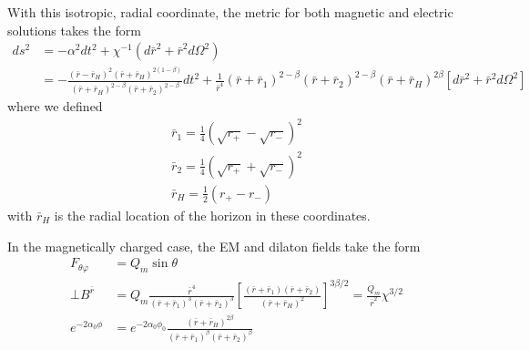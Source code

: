 \documentclass[prd]{revtex4}
\begin{document}
With this isotropic, radial coordinate, the metric for both magnetic and electric solutions takes the form
\begin{align}
ds^2 &= - \alpha^2 dt^2 + \chi^{-1} (d\bar{r}^2 + \bar{r}^2 d\Omega^2) \nonumber \\
        &= -\frac{(\bar{r} - \bar{r}_H)^2 (\bar{r}+\bar{r}_H)^{2(1-\beta)}}{(\bar{r}+\bar{r}_H)^{2-\beta} (\bar{r}+\bar{r}_2)^{2-\beta}} dt^2 + \frac{1}{\bar{r}^4}(\bar{r}+\bar{r}_1)^{2-\beta} (\bar{r}+\bar{r}_2)^{2-\beta} (\bar{r} + \bar{r}_H)^{2\beta} [ d\bar{r}^2 + \bar{r}^2 d\Omega^2]
\end{align}
where we defined
\begin{align}
\bar{r}_1 = \frac{1}{4} (\sqrt{r_+} - \sqrt{r_-})^2 \\
\bar{r}_2 = \frac{1}{4} (\sqrt{r_+} + \sqrt{r_-})^2 \\
\bar{r}_H = \frac{1}{2} (r_+ - r_-)
\end{align}
with $\bar{r}_H$ is the radial location of the horizon in these coordinates.

In the magnetically charged case, the EM and dilaton fields take the form
\begin{align}
F_{\theta \varphi} &= Q_m \sin \theta \\
\bot B^{\bar{r}} &= Q_m \frac{\bar{r}^4}{(\bar{r} + \bar{r}_1)^3 (\bar{r}+\bar{r}_2)^3} \left[\frac{(\bar{r}+\bar{r}_1)(\bar{r}+\bar{r}_2)}{(\bar{r}+\bar{r}_H)^2} \right]^{3\beta/2} = \frac{Q_m}{\bar{r}^2} \chi^{3/2} \\
e^{-2 \alpha_0 \phi} &= e^{-2 \alpha_0 \phi_0} \frac{(\bar{r}+\bar{r}_H)^{2 \beta}}{(\bar{r}+\bar{r}_1)^\beta (\bar{r} + \bar{r}_2)^\beta}
\end{align}
\end{document}
